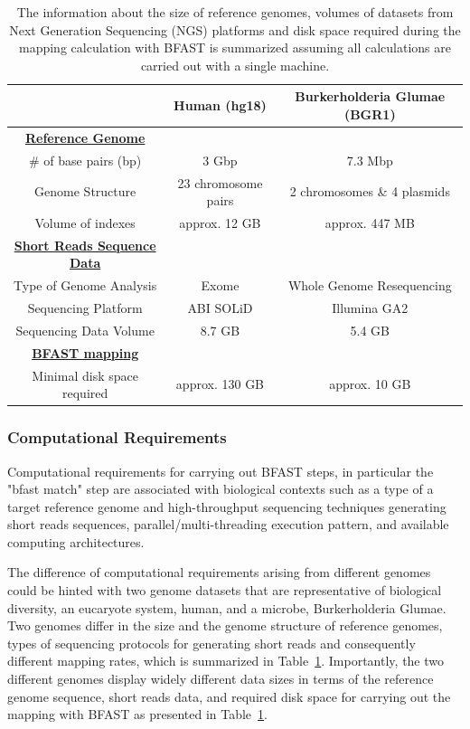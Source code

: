 \documentclass[12pt]{article}
\begin{document}
\begin{table}
\begin{tabular}{|ccc|} 
  \hline 
   & Human (hg18) & Burkerholderia Glumae (BGR1)  \\ \hline
 \underline{\textbf{Reference Genome}}   \\
    \# of base pairs (bp) &  3 Gbp & 7.3 Mbp \\
   Genome Structure &   23 chromosome pairs  & 2 chromosomes \& 4 plasmids  \\  
    Volume of indexes  & approx. 12 GB  & approx. 447 MB  \\
    \underline{ \textbf{Short Reads Sequence Data}}   \\
  Type of Genome Analysis &  Exome  & Whole Genome Resequencing \\
  Sequencing Platform & ABI SOLiD  &  Illumina GA2 \\
  Sequencing Data Volume  & 8.7 GB & 5.4 GB \\
  \underline{ \textbf{BFAST mapping} }  \\
  Minimal disk space required  &  approx. 130 GB   &    approx. 10 GB   \\

\hline
\end{tabular} \caption{The information about the size of reference genomes, volumes of datasets from Next Generation Sequencing (NGS) platforms and disk space required during the mapping calculation with BFAST is summarized assuming all calculations are carried out with a single machine.}
 \label{table:two-genomes} 
\end{table}

\subsubsection{Computational Requirements}

Computational requirements for carrying out BFAST steps, in particular the "bfast match" step are associated with biological contexts such as a type of a target reference genome and high-throughput sequencing techniques generating short reads sequences, parallel/multi-threading execution pattern, and available computing architectures.  

The difference of computational requirements arising from different genomes could be hinted with two genome datasets that are representative of biological diversity, an eucaryote system, human, and a microbe, Burkerholderia Glumae\cite{kim2011}.  Two genomes differ in the size and the genome structure of reference genomes, types of sequencing protocols for generating short reads and consequently different mapping rates, which is summarized in Table~\ref{table:two-genomes}.  Importantly, the two different genomes display widely different data sizes in terms of the reference genome sequence, short reads data, and required disk space for carrying out the mapping with BFAST as presented in Table~\ref{table:two-genomes}. 
\end{document}
